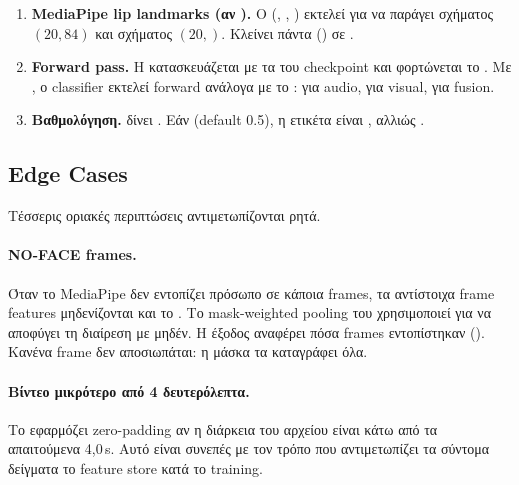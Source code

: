 \begin{enumerate}
  \item \textbf{MediaPipe lip landmarks (αν ).}
        Ο  (,
        ,
        )
        εκτελεί 
        για να παράγει  σχήματος $(20, 84)$
        και  σχήματος $(20,)$.
        Κλείνει πάντα () σε .

  \item \textbf{Forward pass.}
        Η  κατασκευάζεται
        με τα  του checkpoint
        και φορτώνεται το .
        Με , ο classifier εκτελεί forward
        ανάλογα με το :
         για audio,
         για visual,
         για fusion.

  \item \textbf{Βαθμολόγηση.}
         δίνει .
        Εάν  (default 0.5),
        η ετικέτα είναι , αλλιώς .
\end{enumerate}

\subsection{Edge Cases}
\label{subsec:predict-edge}

Τέσσερις οριακές περιπτώσεις αντιμετωπίζονται ρητά.

\paragraph{NO-FACE frames.}
Όταν το MediaPipe δεν εντοπίζει πρόσωπο σε κάποια frames,
τα αντίστοιχα frame features μηδενίζονται
και το .
Το mask-weighted pooling του  χρησιμοποιεί
 για να αποφύγει τη διαίρεση με μηδέν.
Η έξοδος  αναφέρει πόσα frames εντοπίστηκαν
().
Κανένα frame δεν αποσιωπάται: η μάσκα τα καταγράφει όλα.

\paragraph{Βίντεο μικρότερο από 4 δευτερόλεπτα.}
Το  εφαρμόζει zero-padding
αν η διάρκεια του αρχείου είναι κάτω από τα απαιτούμενα 4,0\,s.
Αυτό είναι συνεπές με τον τρόπο που αντιμετωπίζει τα σύντομα δείγματα
το feature store κατά το training.

